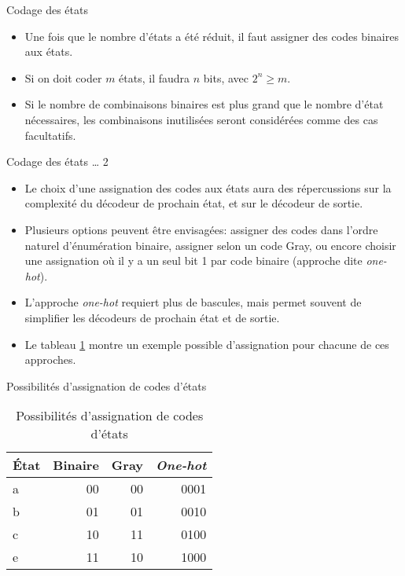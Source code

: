 \documentclass[presentation]{beamer}
\begin{document}
\begin{frame}[label={sec:orgf6d27a7}]{Codage des états}
\begin{itemize}
\item Une fois que le nombre d'états a été réduit, il faut assigner des codes binaires aux états.

\item Si on doit coder \(m\) états, il faudra \(n\) bits, avec \(2^n \geq m\).

\item Si le nombre de combinaisons binaires est plus grand que le nombre d'état nécessaires, les combinaisons inutilisées seront considérées comme des cas facultatifs.
\end{itemize}
\end{frame}

\begin{frame}[label={sec:org7bb42f9}]{Codage des états \ldots{} 2}
\begin{itemize}
\item Le choix d'une assignation des codes aux états aura des répercussions sur la complexité du décodeur de prochain état, et sur le décodeur de sortie.

\item Plusieurs options peuvent être envisagées: assigner des codes dans l'ordre naturel d'énumération binaire, assigner selon un code Gray, ou encore choisir une assignation où il y a un seul bit 1 par code binaire (approche dite \emph{one-hot}).

\item L'approche \emph{one-hot} requiert plus de bascules, mais permet souvent de simplifier les décodeurs de prochain état et de sortie.

\item Le tableau \ref{tab:org8318384} montre un exemple possible d'assignation pour chacune de ces approches.
\end{itemize}
\end{frame}

\begin{frame}[label={sec:org345bc22}]{Possibilités d'assignation de codes d'états}
\begin{table}[htbp]
\caption{\label{tab:org8318384}Possibilités d'assignation de codes d'états}
\centering
\begin{tabular}{lrrr}
État & Binaire & Gray & \emph{One-hot}\\
\hline
a & 00 & 00 & 0001\\
b & 01 & 01 & 0010\\
c & 10 & 11 & 0100\\
e & 11 & 10 & 1000\\
\end{tabular}
\end{table}
\end{frame}
\end{document}
